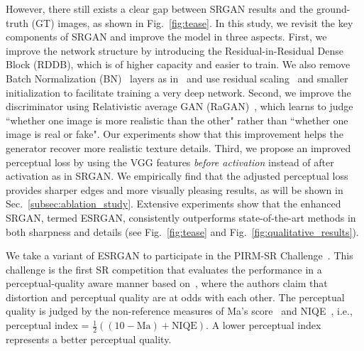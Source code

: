 \documentclass[runningheads]{llncs}
\begin{document}
However, there still exists a clear gap between SRGAN results and the ground-truth (GT) images, as shown in 
Fig.~\ref{fig:tease}. 
In this study, we revisit the key components of SRGAN and improve the model in three aspects.
%
First, we improve the network structure by introducing the Residual-in-Residual Dense Block (RDDB), which is of higher 
capacity and easier to train.
%
We also remove Batch Normalization (BN)~\cite{ioffe2015batch} layers as in~\cite{lim2017enhanced} and use residual 
scaling~\cite{szegedy2016inception,lim2017enhanced} and smaller initialization to facilitate training a very deep 
network. 
%
Second, we improve the discriminator using Relativistic average GAN (RaGAN)~\cite{jolicoeur2018relativistic}, which 
learns to judge ``whether one image is more realistic than the other" rather than ``whether one image is real or 
fake". 
%
Our experiments show that this improvement helps the generator recover more realistic texture details.
%
Third, we propose an improved perceptual loss by using the VGG features \textit{before activation} instead of after 
activation as in SRGAN.
%
We empirically find that the adjusted perceptual loss provides sharper edges and more visually pleasing results, as 
will be shown in Sec.~\ref{subsec:ablation_study}.
Extensive experiments show that the enhanced SRGAN, termed ESRGAN, consistently outperforms state-of-the-art methods in 
both sharpness and details (see Fig.~\ref{fig:tease} and Fig.~\ref{fig:qualitative_results}). 

We take a variant of ESRGAN to participate in the PIRM-SR Challenge~\cite{pirm18url}.
%
This challenge is the first SR competition that evaluates the performance in a perceptual-quality aware manner based 
on~\cite{blau2017perception}, where the authors claim that distortion and perceptual quality are at odds with each 
other. 
%
The perceptual quality is judged by the non-reference measures of Ma's score~\cite{ma2017learning} and 
NIQE~\cite{mittal2013making}, i.e., perceptual index = $\frac{1}{2} ((10-\text{Ma})+\text{NIQE})$. 
A lower perceptual index represents a better perceptual quality.
\end{document}

